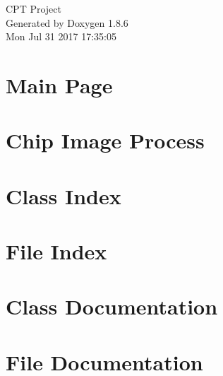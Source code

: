 \documentclass[twoside]{article}
\begin{document}
\hypersetup{pageanchor=false}
\begin{titlepage}
\vspace*{7cm}
\begin{center}%
{\Large C\-P\-T Project }\\
\vspace*{1cm}
{\large Generated by Doxygen 1.8.6}\\
\vspace*{0.5cm}
{\small Mon Jul 31 2017 17:35:05}\\
\end{center}
\end{titlepage}
\tableofcontents
{}
\hypersetup{pageanchor=true}

\section{Main Page}
\label{index}\hypertarget{index}{}
\section{Chip Image Process}
\label{chip_image_process}
\hypertarget{chip_image_process}{}

\section{Class Index}

\section{File Index}

\section{Class Documentation}







\section{File Documentation}












\newpage
{}
{}
\printindex
\end{document}
